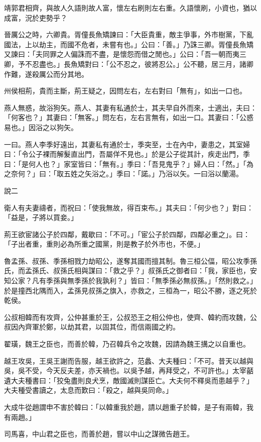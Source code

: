 \begin{pinyinscope}
靖郭君相齊，與故人久語則故人富，懷左右刷則左右重。久語懷刷，小資也，猶以成富，況於吏勢乎？

晉厲公之時，六卿貴。胥僮長魚矯諫曰：「大臣貴重，敵主爭事，外市樹黨，下亂國法，上以劫主，而國不危者，未嘗有也。」公曰：「善。」乃誅三卿。胥僮長魚矯又諫曰：「夫同罪之人偏誅而不盡，是懷怨而借之閒也。」公曰：「吾一朝而夷三卿，予不忍盡也。」長魚矯對曰：「公不忍之，彼將忍公。」公不聽，居三月，諸卿作難，遂殺厲公而分其地。

州侯相荊，貴而主斷，荊王疑之，因問左右，左右對曰「無有」，如出一口也。

燕人無惑，故浴狗矢。燕人、其妻有私通於士，其夫早自外而來，士適出，夫曰：「何客也？」其妻曰：「無客。」問左右，左右言無有，如出一口。其妻曰：「公惑易也。」因浴之以狗矢。

一曰。燕人李季好遠出，其妻私有通於士，季突至，士在內中，妻患之，其室婦曰：「令公子裸而解髮直出門，吾屬佯不見也。」於是公子從其計，疾走出門，季曰：「是何人也？」家室皆曰：「無有。」季曰：「吾見鬼乎？」婦人曰：「然。」「為之奈何？」曰：「取五姓之矢浴之。」季曰：「諾。」乃浴以矢。一曰浴以蘭湯。

說二

衛人有夫妻禱者，而祝曰：「使我無故，得百束布。」其夫曰：「何少也？」對曰：「益是，子將以買妾。」

荊王欲宦諸公子於四鄰，戴歇曰：「不可。」「宦公子於四鄰，四鄰必重之」。曰：「子出者重，重則必為所重之國黨，則是教子於外市也，不便。」

魯孟孫、叔孫、季孫相戮力劫昭公，遂奪其國而擅其制。魯三桓公偪，昭公攻季孫氏，而孟孫氏、叔孫氏相與謀曰：「救之乎？」叔孫氏之御者曰：「我，家臣也，安知公家？凡有季孫與無季孫於我孰利？」皆曰：「無季孫必無叔孫。」「然則救之。」於是撞西北隅而入，孟孫見叔孫之旗入，亦救之，三桓為一，昭公不勝，逐之死於乾侯。

公叔相韓而有攻齊，公仲甚重於王，公叔恐王之相公仲也，使齊、韓約而攻魏，公叔因內齊軍於鄭，以劫其君，以固其位，而信兩國之約。

翟璜，魏王之臣也，而善於韓，乃召韓兵令之攻魏，因請為魏王搆之以自重也。

越王攻吳，王吳王謝而告服，越王欲許之，范蠡、大夫種曰：「不可。昔天以越與吳，吳不受，今天反夫差，亦天禍也。以吳予越，再拜受之，不可許也。」太宰嚭遺大夫種書曰：「狡兔盡則良犬烹，敵國滅則謀臣亡。大夫何不釋吳而患越乎？」大夫種受書讀之，太息而歎曰：「殺之，越與吳同命。」

大成牛從趙謂申不害於韓曰：「以韓重我於趙，請以趙重子於韓，是子有兩韓，我有兩趙。」

司馬喜，中山君之臣也，而善於趙，嘗以中山之謀微告趙王。


\end{pinyinscope}
